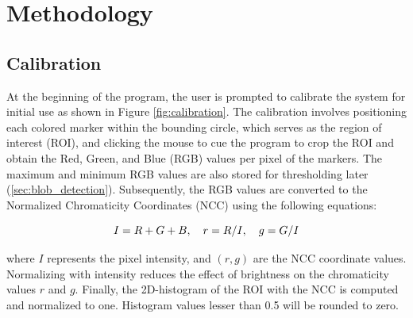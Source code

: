\documentclass[10pt,a4paper,twoside]{article}
\begin{document}
\section{Methodology}\label{sec:methodology}

\subsection{Calibration}\label{sec:calibration} 
At the beginning of the program, the user is prompted to calibrate the system for initial use as shown in Figure \ref{fig:calibration}. The calibration involves positioning each colored marker within the bounding circle, which serves as the region of interest (ROI), and clicking the mouse to cue the program to crop the ROI and obtain the Red, Green, and Blue (RGB) values per pixel of the markers. The maximum and minimum RGB values are also stored for thresholding later (\ref{sec:blob_detection}). Subsequently, the RGB values are converted to the Normalized Chromaticity Coordinates (NCC) using the following equations:

\begin{equation}
    \centering
    I = R + G + B, \quad
    r = R/I, \quad
    g = G/I
\end{equation}{}

where $I$ represents the pixel intensity, and  $(r,g)$ are the NCC coordinate values. Normalizing with intensity reduces the effect of brightness on the chromaticity values $r$ and $g$. Finally, the 2D-histogram of the ROI with the NCC is computed and normalized to one. Histogram values lesser than 0.5 will be rounded to zero.
\end{document}
